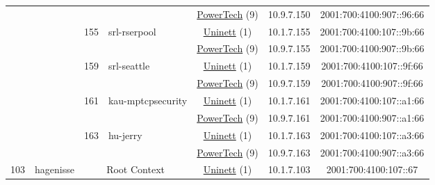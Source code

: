 \begin{small}
\begin{center}
\begin{longtable}{|c|c|c|c|c|c|c|c|}
  &  &  &  & \multicolumn{2}{|c|}{\tiny{\href{http://www.powertech.no}{PowerTech} (9)}} & \tiny{10.9.7.150} & \tiny{2001:700:4100:907::96:66} \\* \cline{3-3}\cline{4-4}\cline{5-5}\cline{6-6}\cline{7-7}\cline{8-8}
  &  & \multirow{2}{*}{\tiny{155}} & \multicolumn{1}{|l|}{\multirow{2}{*}{\tiny{srl-rserpool}}} & \multicolumn{2}{|c|}{\tiny{\href{https://www.uninett.no}{Uninett} (1)}} & \tiny{10.1.7.155} & \tiny{2001:700:4100:107::9b:66} \\* \cline{5-5}\cline{6-6}\cline{7-7}\cline{8-8}
  &  &  &  & \multicolumn{2}{|c|}{\tiny{\href{http://www.powertech.no}{PowerTech} (9)}} & \tiny{10.9.7.155} & \tiny{2001:700:4100:907::9b:66} \\* \cline{3-3}\cline{4-4}\cline{5-5}\cline{6-6}\cline{7-7}\cline{8-8}
  &  & \multirow{2}{*}{\tiny{159}} & \multicolumn{1}{|l|}{\multirow{2}{*}{\tiny{srl-seattle}}} & \multicolumn{2}{|c|}{\tiny{\href{https://www.uninett.no}{Uninett} (1)}} & \tiny{10.1.7.159} & \tiny{2001:700:4100:107::9f:66} \\* \cline{5-5}\cline{6-6}\cline{7-7}\cline{8-8}
  &  &  &  & \multicolumn{2}{|c|}{\tiny{\href{http://www.powertech.no}{PowerTech} (9)}} & \tiny{10.9.7.159} & \tiny{2001:700:4100:907::9f:66} \\* \cline{3-3}\cline{4-4}\cline{5-5}\cline{6-6}\cline{7-7}\cline{8-8}
  &  & \multirow{2}{*}{\tiny{161}} & \multicolumn{1}{|l|}{\multirow{2}{*}{\tiny{kau-mptcpsecurity}}} & \multicolumn{2}{|c|}{\tiny{\href{https://www.uninett.no}{Uninett} (1)}} & \tiny{10.1.7.161} & \tiny{2001:700:4100:107::a1:66} \\* \cline{5-5}\cline{6-6}\cline{7-7}\cline{8-8}
  &  &  &  & \multicolumn{2}{|c|}{\tiny{\href{http://www.powertech.no}{PowerTech} (9)}} & \tiny{10.9.7.161} & \tiny{2001:700:4100:907::a1:66} \\* \cline{3-3}\cline{4-4}\cline{5-5}\cline{6-6}\cline{7-7}\cline{8-8}
  &  & \multirow{2}{*}{\tiny{163}} & \multicolumn{1}{|l|}{\multirow{2}{*}{\tiny{hu-jerry}}} & \multicolumn{2}{|c|}{\tiny{\href{https://www.uninett.no}{Uninett} (1)}} & \tiny{10.1.7.163} & \tiny{2001:700:4100:107::a3:66} \\* \cline{5-5}\cline{6-6}\cline{7-7}\cline{8-8}
  &  &  &  & \multicolumn{2}{|c|}{\tiny{\href{http://www.powertech.no}{PowerTech} (9)}} & \tiny{10.9.7.163} & \tiny{2001:700:4100:907::a3:66} \\ \hline
 \multirow{24}{*}{\tiny{103}} & \multicolumn{1}{|l|}{\multirow{24}{*}{\tiny{hagenisse}}} & \multicolumn{2}{|c|}{\multirow{2}{*}{\tiny{Root Context}}} & \multicolumn{2}{|c|}{\tiny{\href{https://www.uninett.no}{Uninett} (1)}} & \tiny{10.1.7.103} & \tiny{2001:700:4100:107::67} \\* \cline{5-5}\cline{6-6}\cline{7-7}\cline{8-8}

\end{longtable}
\end{center}
\end{small}
